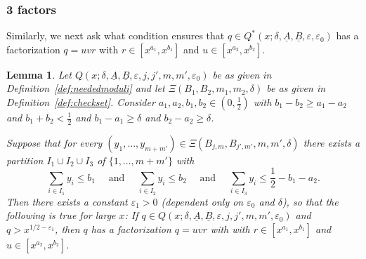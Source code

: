 \documentclass{amsart}
\newtheorem{lemma}{Lemma}
\numberwithin{equation}{section}
\begin{document}
 
\subsubsection{3 factors}

Similarly, we next ask what condition ensures that $q \in Q^*(x;\delta,\underline{A},\underline{B},\varepsilon,\varepsilon_0)$ has a factorization $q=uvr$ with $r \in [x^{a_1},x^{b_1}]$ and $u \in [x^{a_2},x^{b_2}]$. 

 
\begin{lemma}\label{lem:partition2} Let $Q(x;\delta,\underline{A},\underline{B},\varepsilon,j,j',m,m',\varepsilon_0)$ be as given in Definition~\ref{def:neededmoduli} and let $\Xi(B_1,B_2,m_1,m_2,\delta)$ be as given in Definition~\ref{def:checkset}. 
 Consider $a_1, a_2, b_1, b_2 \in (0,\frac{1}{2})$   with $b_1 -b_2 \geq a_1-a_2$ and  $b_1 + b_2 < \frac{1}{2}$ and $b_1-a_1 \geq \delta$ and $b_2-a_2 \geq \delta$.
 
 \smallskip
 
  Suppose that for every  $(y_1, \dots, y_{m+m'}) \in \Xi(B_{j,m},B_{j',m'},m,m',\delta)$  there exists a partition  $I_1 \cup I_2 \cup I_3$ of $\{1, \dots, m+m'\}$ with 
$$ \sum_{i \in I_1} y_i \leq b_1 \quad \mbox{ and } \quad  \sum_{i \in I_2} y_i \leq  b_2  
\quad \mbox{ and } \quad  \sum_{i \in I_3} y_i \leq  \frac{1}{2} - b_1 -a_2. $$
Then there exists a constant $\varepsilon_1>0$ (dependent only on $\varepsilon_0$ and $\delta$), so that the following is true for large $x$:  If $q \in Q(x;\delta,\underline{A},\underline{B},\varepsilon,j,j',m,m',\varepsilon_0)$ and $q > x^{1/2-\varepsilon_1}$, then $q$ has a factorization $q=uvr$ with with $r \in  [x^{a_1}, x^{b_1}]$ and $u \in [x^{a_2},x^{b_2}]$. 
\end{lemma} 
\end{document}
